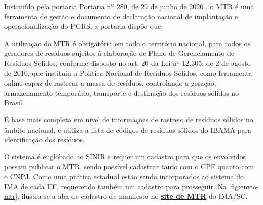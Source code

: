 Instituído pela portaria Portaria nº 280, de 29 de junho de 2020 \cite{mma_portaria_202}, o \gls{MTR} é uma ferramenta de gestão e documento de declaração nacional de implantação e operacionalização do \gls{PGRS}; a portaria dispõe que:

\begin{citacao}
	A utilização do MTR é obrigatória em todo o território nacional, para todos os geradores de resíduos sujeitos à elaboração de Plano de Gerenciamento de Resíduos Sólidos, conforme disposto no art. 20 da Lei nº 12.305, de 2 de agosto de 2010, que instituiu a Política Nacional de Resíduos Sólidos, como ferramenta online capaz de rastrear a massa de resíduos, controlando a geração, armazenamento temporário, transporte e destinação dos resíduos sólidos no Brasil. \cite[Art. 2º]{mma_portaria_202}
\end{citacao}

É base mais completa em nível de informações de rastreio de resíduos sólidos no âmbito nacional, e utiliza a lista de códigos de resíduos sólidos do \gls{IBAMA} para identificação dos resíduos.

O sistema é englobado ao \gls{SINIR} e requer um cadastro para que os envolvidos possam publicar o \gls{MTR}, sendo possível cadastrar tanto com o \gls{CPF} quanto com o \gls{CNPJ}. Como uma prática estadual estão sendo incorporados ao sistema do \gls{IMA} de cada \gls{UF}, requerendo também um cadastro para prosseguir. Na \autoref{fig:envio-mtr}, ilustra-se a aba de cadastro de manifesto no \href{http://mtr.ima.sc.gov.br/}{\textbf{site de MTR}} do \gls{IMA/SC}.

